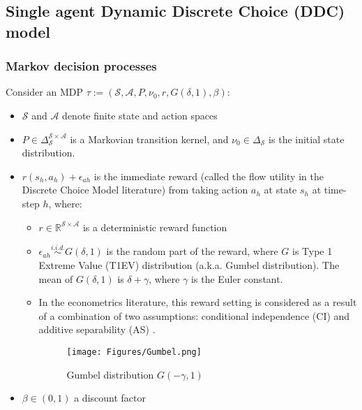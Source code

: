 \subsection{Single agent Dynamic Discrete Choice (DDC) model}\label{sec:SingleDDC}

\subsubsection*{Markov decision processes} 
Consider an MDP $\tau:=\left(\mathcal{S}, \mathcal{A}, P, \nu_0, r, G(\delta,1), \beta \right)$:
\begin{itemize}
    \item $\mathcal{S}$ and $\mathcal{A}$ denote finite state and action spaces
    \item $P \in \Delta_{\mathcal{S}}^{\mathcal{S} \times \mathcal{A}}$ is a Markovian transition kernel, and $\nu_0 \in \Delta_{\mathcal{S}}$ is the initial state distribution. 
    \item $r(s_h,a_h)+\epsilon_{ah}$ is the immediate reward (called the flow utility in the Discrete Choice Model literature) from taking action $a_h$ at state $s_h$ at time-step $h$, where:
    \begin{itemize}
        \item $r \in \mathbb{R}^{\mathcal{S} \times \mathcal{A}}$ is a deterministic reward function
        \item  
    $\epsilon_{ah}\overset{i.i.d.}{\sim}  G(\delta, 1)$ is the random part of the reward, where $G$ is Type 1 Extreme Value (T1EV) distribution (a.k.a. Gumbel distribution). The mean of $G(\delta, 1)$ is $\delta + \gamma$, where $\gamma$ is the Euler constant. 
    \item In the econometrics literature, this reward setting is considered as a result of a combination of two assumptions: conditional independence (CI) and additive separability (AS) \cite{magnac2002identifying}. 
\begin{figure}[H]
    \centering
    \texttt{[image: Figures/Gumbel.png]}
    \caption{Gumbel distribution $G(-\gamma, 1)$}
\end{figure}
    \end{itemize}
    \item $\beta \in(0,1)$ a discount factor
    
\end{itemize}
\;

